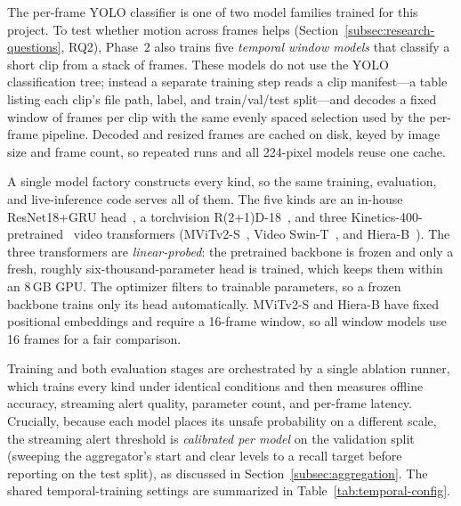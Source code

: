 \documentclass[conference]{IEEEtran}
\begin{document}
The per-frame YOLO classifier is one of two model families trained for
this project. To test whether motion across frames helps
(Section~\ref{subsec:research-questions}, RQ2), Phase~2 also trains five
\emph{temporal window models} that classify a short clip from a stack of
frames. These models do not use the YOLO classification tree; instead a separate
training step reads a clip manifest---a table listing each clip's file path,
label, and train/val/test split---and decodes a fixed window of frames per clip
with the same evenly spaced selection used by the per-frame pipeline. Decoded
and resized frames are cached on disk, keyed by image size and frame
count, so repeated runs and all 224-pixel models reuse one cache.

A single model factory constructs every
kind, so the same training, evaluation, and live-inference code
serves all of them. The five kinds are an in-house ResNet18+GRU
head~\cite{b11,b12}, a torchvision R(2+1)D-18~\cite{b7}, and three
Kinetics-400-pretrained~\cite{b13} video transformers
(MViTv2-S~\cite{b8}, Video Swin-T~\cite{b9}, and Hiera-B~\cite{b10}).
The three transformers
are \emph{linear-probed}: the pretrained backbone is frozen and only a
fresh, roughly six-thousand-parameter head is trained, which keeps them
within an 8\,GB GPU. The optimizer filters to trainable parameters, so a
frozen backbone trains only its head automatically. MViTv2-S and Hiera-B
have fixed positional embeddings and require a 16-frame window, so all
window models use 16 frames for a fair comparison.

Training and both evaluation stages are orchestrated by a single ablation
runner, which trains every kind under identical
conditions and then measures offline accuracy, streaming alert quality,
parameter count, and per-frame latency. Crucially, because each model
places its unsafe probability on a different scale, the streaming alert
threshold is \emph{calibrated per model} on the validation split (sweeping
the aggregator's start and clear levels to a recall target before reporting on
the test split), as discussed in Section~\ref{subsec:aggregation}. The
shared temporal-training settings are summarized in
Table~\ref{tab:temporal-config}.
\end{document}
